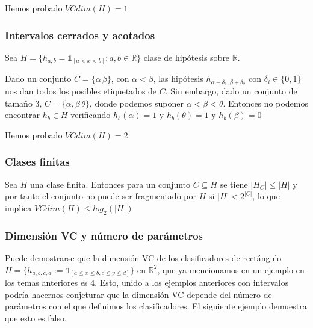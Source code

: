 Hemos probado $VCdim(H) = 1$.

\subsubsection{Intervalos cerrados y acotados}

Sea $H = \{h_{a,b} = \mathds{1}_[a<x<b]: a,b\in \mathbb{R}\}$ clase de hipótesis sobre $\mathbb{R}$. 

Dado un conjunto $C=\{\alpha\, \beta\}$, con $\alpha < \beta$, las hipótesis $h_{\alpha+\delta_1, \beta + \delta_2}$ con $\delta_i \in \{0,1\}$ nos dan todos los posibles etiquetados de $C$.
Sin embargo, dado un conjunto de tamaño 3, $C=\{\alpha, \beta\, \theta\}$, donde podemos suponer $\alpha < \beta < \theta$. Entonces no podemos encontrar $h_b \in H$ verificando $h_b(\alpha)=1$ y $h_b(\theta) = 1$ y $h_b(\beta) = 0$

Hemos probado $VCdim(H) = 2$.

\subsubsection{Clases finitas}

Sea $H$ una clase finita. Entonces para un conjunto $C \subseteq H$ se tiene $|H_C| \le |H|$ y por tanto el 
conjunto no puede ser fragmentado por $H$ si $|H| < 2^{|C|}$, lo que implica $VCdim(H) \le log_2(|H|)$

\subsubsection{Dimensión VC y número de parámetros}

Puede demostrarse que la dimensión VC de los clasificadores de rectángulo $H = \{h_{a,b,c,d} := \mathds{1}_{[a\le x\le b, c\le y\le d]}\}$ en $\mathbb{R}^2$, que ya mencionamos en un ejemplo en los temas anteriores es 4. Esto, unido a los ejemplos anteriores con intervalos podría hacernos conjeturar que la dimensión VC depende del número de parámetros con el que definimos los clasificadores. El siguiente ejemplo demuestra que esto es falso.

